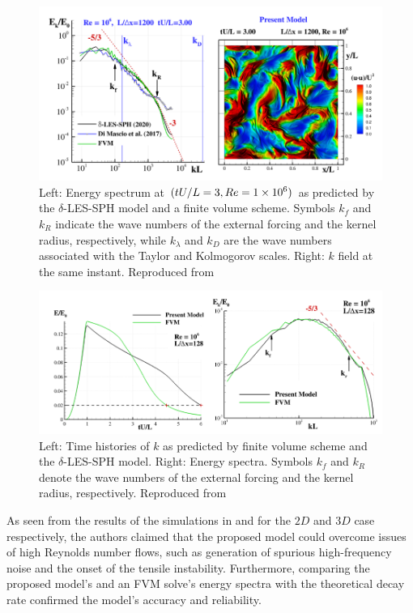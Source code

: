 \begin{figure}[H]
    \centering
    \includegraphics[scale=0.7]{Figures/research_papers/Colagrossi2021QuasiLagrangian-fig-4.png}
    \caption{Left: Energy spectrum at $(tU/L = 3, Re = 1 \times {10}^{6})$ as predicted by the $\delta$-LES-SPH model and a finite volume scheme. Symbols $k_f$ and $k_R$ indicate the wave numbers of the external forcing and the kernel radius, respectively, while $k_{\lambda}$ and $k_D$ are the wave numbers associated with the Taylor and Kolmogorov scales. Right: $k$ field at the same instant. Reproduced from \cite{Colagrossi2021QuasiLagrangian}}
    \label{fig:Colagrossi2021QuasiLagrangian-fig-4}
\end{figure}
\begin{figure}[H]
    \centering
    \includegraphics[scale=0.65]{Figures/research_papers/Colagrossi2021QuasiLagrangian-fig-8.png}
    \caption{Left: Time histories of $k$ as predicted by finite volume scheme and the $\delta$-LES-SPH model. Right: Energy spectra. Symbols $k_f$ and $k_R$ denote the wave numbers of the external forcing and the kernel radius, respectively. Reproduced from \cite{Colagrossi2021QuasiLagrangian}}
    \label{fig:Colagrossi2021QuasiLagrangian-fig-8}
\end{figure}

As seen from the results of the simulations in  and  for the $2D$ and $3D$ case respectively, the authors claimed that the proposed model could overcome issues of high Reynolds number flows, such as generation of spurious high-frequency noise and the onset of the tensile instability. Furthermore, comparing the proposed model’s and an FVM solve’s energy spectra with the theoretical decay rate confirmed the model’s accuracy and reliability.

